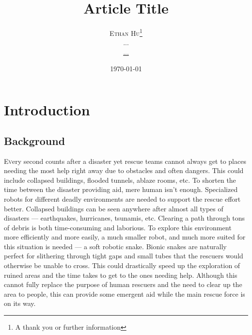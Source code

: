 \documentclass[twoside]{article}
\title{Article Title} %
\author{%
\textsc{Ethan Hu}\thanks{A thank you or further information} \\[1ex] %
\normalsize ... \\ %
\normalsize \href{mailto:...}{...} %
}
\date{\today} %
\begin{document}
\maketitle


\section{Introduction}
\subsection{Background}
\lettrine[nindent=0em,lines=3]{E} very second counts after a disaster yet rescue teams cannot always get to places needing the most help right away due to obstacles and often dangers. This could include collapsed buildings, flooded tunnels, ablaze rooms, etc. To shorten the time between the disaster providing aid, mere human isn’t enough. Specialized robots for different deadly environments are needed to support the rescue effort better. 
Collapsed buildings can be seen anywhere after almost all types of disasters — earthquakes, hurricanes, tsunamis, etc. Clearing a path through tons of debris is both time-consuming and laborious. To explore this environment more efficiently and more easily, a much smaller robot, and much more suited for this situation is needed — a soft robotic snake. Bionic snakes are naturally perfect for slithering through tight gaps and small tubes that the rescuers would otherwise be unable to cross. This could drastically speed up the exploration of ruined areas and the time takes to get to the ones needing help. Although this cannot fully replace the purpose of human rescuers and the need to clear up the area to people, this can provide some emergent aid while the main rescue force is on its way. 
\end{document}
